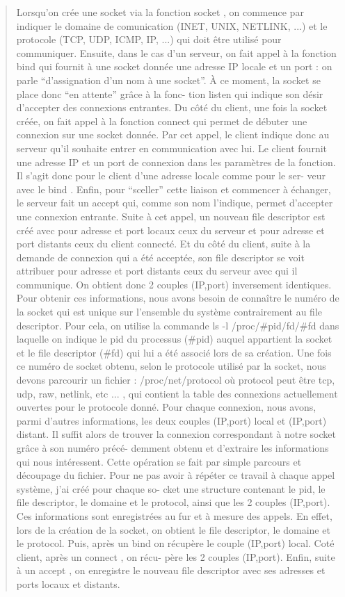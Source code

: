 \documentclass{article}
\begin{document}
\begin{quotation}
{\color{green} Lorsqu’on crée une socket via la fonction socket , on commence
  par indiquer le domaine de comunication (INET, UNIX, NETLINK, ...) et le
  protocole (TCP, UDP, ICMP, IP, ...) qui doit être utilisé pour
  communiquer. Ensuite, dans le cas d’un serveur, on fait appel à la fonction
  bind qui fournit à une socket donnée une adresse IP locale et un port : on
  parle “d’assignation d’un nom à une socket”. À ce moment, la socket se place
  donc “en attente” grâce à la fonc- tion listen qui indique son désir
  d’accepter des connexions entrantes. Du côté du client, une fois la socket
  créée, on fait appel à la fonction connect qui permet de débuter une connexion
  sur une socket donnée. Par cet appel, le client indique donc au serveur qu’il
  souhaite entrer en communication avec lui. Le client fournit une adresse IP et
  un port de connexion dans les paramètres de la fonction. Il s’agit donc pour
  le client d’une adresse locale comme pour le ser- veur avec le bind . Enfin,
  pour “sceller” cette liaison et commencer à échanger, le serveur fait un
  accept qui, comme son nom l’indique, permet d’accepter une connexion
  entrante. Suite à cet appel, un nouveau file descriptor est créé avec pour
  adresse et port locaux ceux du serveur et pour adresse et port distants ceux
  du client connecté. Et du côté du client, suite à la demande de connexion qui
  a été acceptée, son file descriptor se voit attribuer pour adresse et port
  distants ceux du serveur avec qui il communique. On obtient donc 2 couples
  (IP,port) inversement identiques.  Pour obtenir ces informations, nous avons
  besoin de connaître le numéro de la socket qui est unique sur l’ensemble du
  système contrairement au file descriptor. Pour cela, on utilise la commande ls
  -l /proc/#pid/fd/#fd dans laquelle on indique le pid du processus (#pid)
  auquel appartient la socket et le file descriptor (#fd) qui lui a été associé
  lors de sa création. Une fois ce numéro de socket obtenu, selon le protocole
  utilisé par la socket, nous devons parcourir un fichier : /proc/net/protocol
  où protocol peut être tcp, udp, raw, netlink, etc ... , qui contient la table
  des connexions actuellement ouvertes pour le protocole donné. Pour chaque
  connexion, nous avons, parmi d’autres informations, les deux couples (IP,port)
  local et (IP,port) distant. Il suffit alors de trouver la connexion
  correspondant à notre socket grâce à son numéro précé- demment obtenu et
  d’extraire les informations qui nous intéressent. Cette opération se fait par
  simple parcours et découpage du fichier.  Pour ne pas avoir à répéter ce
  travail à chaque appel système, j’ai créé pour chaque so- cket une structure
  contenant le pid, le file descriptor, le domaine et le protocol, ainsi que les
  2 couples (IP,port). Ces informations sont enregistrées au fur et à mesure des
  appels. En effet, lors de la création de la socket, on obtient le file
  descriptor, le domaine et le protocol. Puis, après un bind on récupère le
  couple (IP,port) local. Coté client, après un connect , on récu- père les 2
  couples (IP,port). Enfin, suite à un accept , on enregistre le nouveau file
  descriptor avec ses adresses et ports locaux et distants. }
\end{quotation}
\end{document}
